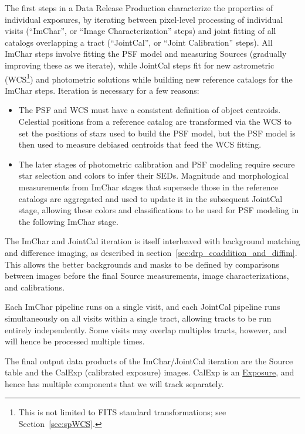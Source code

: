 The first steps in a Data Release Production characterize the properties of individual exposures, by iterating between pixel-level processing of individual visits (``ImChar'', or ``Image Characterization'' steps) and joint fitting of all catalogs overlapping a tract (``JointCal'', or ``Joint Calibration'' steps).  All ImChar steps involve fitting the PSF model and measuring Sources (gradually improving these as we iterate), while JointCal steps fit for new astrometric (WCS\footnote{This is not limited to FITS standard transformations; see Section~\ref{sec:spWCS}.}) and photometric solutions while building new reference catalogs for the ImChar steps.  Iteration is necessary for a few reasons:
\begin{itemize}
\item The PSF and WCS must have a consistent definition of object centroids.  Celestial positions from a reference catalog are transformed via the WCS to set the positions of stars used to build the PSF model, but the PSF model is then used to measure debiased centroids that feed the WCS fitting.
\item The later stages of photometric calibration and PSF modeling require secure star selection and colors to infer their SEDs.  Magnitude and morphological measurements from ImChar stages that supersede those in the reference catalogs are aggregated and used to update it in the subsequent JointCal stage, allowing these colors and classifications to be used for PSF modeling in the following ImChar stage.
\end{itemize}

The ImChar and JointCal iteration is itself interleaved with background matching and difference imaging, as described in section~\ref{sec:drp_coaddition_and_diffim}.  This allows the better backgrounds and masks to be defined by comparisons between images before the final Source measurements, image characterizations, and calibrations.

Each ImChar pipeline runs on a single visit, and each JointCal pipeline runs simultaneously on all visits within a single tract, allowing tracts to be run entirely independently.  Some visits may overlap multiples tracts, however, and will hence be processed multiple times.

The final output data products of the ImChar/JointCal iteration are the Source table and the CalExp (calibrated exposure) images.  CalExp is an \hyperref[sec:spImagesExposure]{Exposure}, and hence has multiple components that we will track separately.

